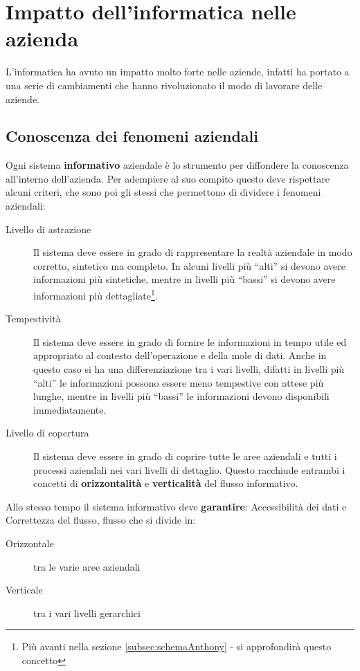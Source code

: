 \section{Impatto dell'informatica nelle azienda}
    L'informatica ha avuto un impatto molto forte nelle aziende, infatti ha portato a una serie di cambiamenti che hanno rivoluzionato il modo di lavorare delle aziende.
    \subsection{Conoscenza dei fenomeni aziendali}
        Ogni sistema \textbf{informativo} aziendale è lo strumento per diffondere la conoscenza all'interno dell'azienda. Per adempiere al suo compito questo deve rispettare alcuni criteri, che sono poi gli stessi che permettono di dividere i fenomeni aziendali:
        \begin{description}
            \item[Livello di astrazione] Il sistema deve essere in grado di rappresentare la realtà aziendale in modo corretto, sintetico ma completo. In alcuni livelli più ``alti'' si devono avere informazioni più sintetiche, mentre in livelli più ``bassi'' si devono avere informazioni più dettagliate\footnote{Più avanti nella sezione \ref{subsec:schemaAnthony} -  si approfondirà questo concetto}. 
            \item[Tempestività] Il sistema deve essere in grado di fornire le informazioni in tempo utile ed appropriato al contesto dell'operazione e della mole di dati. Anche in questo caso si ha una differenziazione tra i vari livelli, difatti in livelli più ``alti'' le informazioni possono essere meno tempestive con attese più lunghe, mentre in livelli più ``bassi'' le informazioni devono disponibili immediatamente.
            \item[Livello di copertura] Il sistema deve essere in grado di coprire tutte le aree aziendali e tutti i processi aziendali nei vari livelli di dettaglio. Questo racchiude entrambi i concetti di \textbf{orizzontalità} e \textbf{verticalità} del flusso informativo.
        \end{description}
        Allo stesso tempo il sistema informativo deve \textbf{garantire}: Accessibilità dei dati e Correttezza del flusso, flusso che si divide in:
        \begin{description}
            \item[Orizzontale] tra le varie aree aziendali
            \item[Verticale] tra i vari livelli gerarchici
        \end{description}
